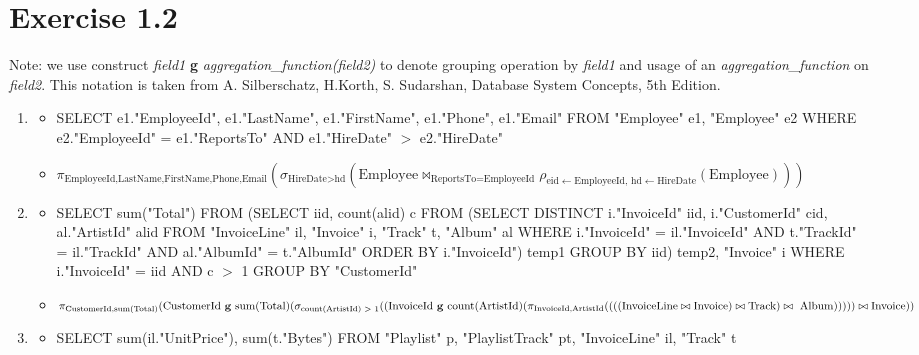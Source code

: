 \documentclass[10pt]{article}
\begin{document}
  \section*{Exercise 1.2}
  Note: we use construct \textit{field1} \textbf{g} \textit{aggregation\_function(field2)} to denote grouping operation by \textit{field1} and usage of an \textit{aggregation\_function} on \textit{field2}. This notation is taken from A. Silberschatz, H.Korth, S. Sudarshan, Database System Concepts, 5th Edition.
  \begin{enumerate}[label=\arabic*.]
  \item
  	\begin{itemize}
    \item
 	SELECT e1."EmployeeId", e1."LastName", e1."FirstName", e1."Phone", e1."Email"
	FROM "Employee" e1, "Employee" e2
	WHERE e2."EmployeeId" =  e1."ReportsTo" AND e1."HireDate" $>$ e2."HireDate"
    \item
    $\pi_{\text{EmployeeId,LastName,FirstName,Phone,Email}}(\sigma_{\text{HireDate}
    > \text{hd}}(\text{Employee} \bowtie_{\text{ReportsTo=EmployeeId}} \rho_{\text{eid}
    \leftarrow \text{EmployeeId, hd} \leftarrow \text{HireDate}}(\text{Employee})))$
    \end{itemize}
  \item
  	\begin{itemize}
    \item
  SELECT sum("Total") FROM
	(SELECT iid, count(alid) c FROM (SELECT DISTINCT i."InvoiceId" iid, i."CustomerId" cid,
  al."ArtistId" alid FROM "InvoiceLine" il, "Invoice" i, "Track" t, "Album" al
	WHERE i."InvoiceId" = il."InvoiceId" AND t."TrackId" = il."TrackId" AND al."AlbumId"
  = t."AlbumId" ORDER BY i."InvoiceId") temp1 GROUP BY iid) temp2,
	"Invoice" i
WHERE
i."InvoiceId" = iid AND c $>$ 1 GROUP BY "CustomerId"
    \item
    $\pi_{\text{CustomerId,sum(Total)}}(\text{CustomerId \textbf{g} sum(Total)}\\(\sigma_{\text{count(ArtistId) $>$ 1}}((\text{InvoiceId \textbf{g} count(ArtistId)}(\pi_{\text{InvoiceId,ArtistId}}((((\text{InvoiceLine} \bowtie \text{Invoice}) \bowtie \text{Track}) \bowtie\text{ Album})))))\bowtie \text{Invoice}))$
    \end{itemize}
  \item
  	\begin{itemize}
    \item
    SELECT sum(il."UnitPrice"), sum(t."Bytes")
    FROM "Playlist" p, "PlaylistTrack" pt, "InvoiceLine" il, "Track" t

\end{itemize}
\end{enumerate}
\end{document}
